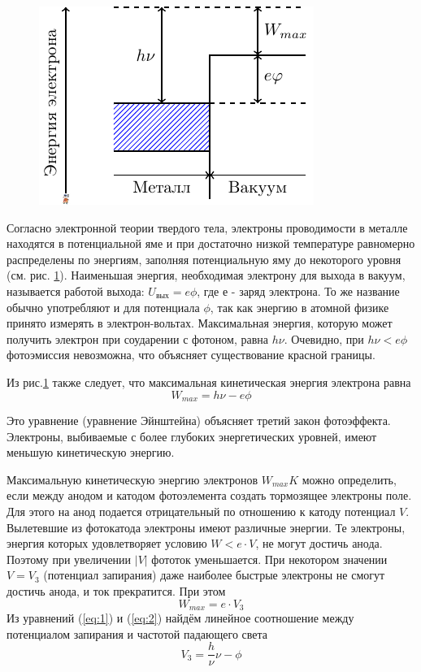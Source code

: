 \begin{figure}[h]
	\centering
	\includegraphics[]{fig/fig1}
	\caption{}
	\label{fig:1}
\end{figure}
Согласно электронной теории твердого тела, электроны проводимости в металле находятся в потенциальной яме и при достаточно низкой температуре равномерно распределены по энергиям, заполняя потенциальную яму до некоторого уровня (см. рис. \ref{fig:1}).
Наименьшая энергия, необходимая электрону для выхода в вакуум, называется работой выхода: $U_{\text{вых}} = e\phi$, где $е$ - заряд электрона. То же название обычно употребляют и для потенциала $\phi$, так как энергию в атомной физике принято измерять в электрон-вольтах. Максимальная энергия, которую может получить электрон при соударении с фотоном, равна $h \nu$. Очевидно, при $h \nu<e\phi$ фотоэмиссия невозможна, что объясняет существование красной границы.

Из рис.\ref{fig:1} также следует, что максимальная кинетическая энергия электрона равна
\begin{equation}
	\label{eq:1}
 	W_{max}=h \nu -e\phi
 \end{equation} 

Это уравнение (уравнение Эйнштейна) объясняет третий закон
фотоэффекта. Электроны, выбиваемые с более глубоких энергетических уровней, имеют меньшую кинетическую энергию.

Максимальную кинетическую энергию электронов $W_{max}K$ можно определить, если между анодом и катодом фотоэлемента создать тормозящее электроны поле. Для этого на анод подается отрицательный по отношению к катоду потенциал $V$. Вылетевшие из фотокатода электроны имеют различные энергии. Те электроны, энергия которых удовлетворяет условию $W < e\cdot V$, не могут достичь анода. Поэтому при увеличении $ |V|$ фототок уменьшается. При некотором значении $V = V_{3}$ (потенциал запирания) даже наиболее быстрые электроны не смогут достичь анода, и ток прекратится. При этом
\begin{equation}
	\label{eq:2}
	W_{max}=e\cdot V_{3}
\end{equation}
Из уравнений (\ref{eq:1}) и (\ref{eq:2}) найдём линейное соотношение между потенциалом запирания и частотой падающего света
\begin{equation}
	\label{eq:3}
	V_{3}=\frac h\nu \nu-\phi
\end{equation}

